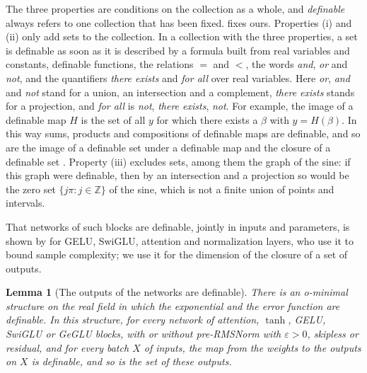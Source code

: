 \documentclass[10pt]{article}
\newtheorem{lemma}[theorem]{Lemma}
\theoremstyle{definition}
\theoremstyle{remark}
\begin{document}
The three properties are conditions on the collection as a whole, and \emph{definable} always refers to one collection that has been fixed.  fixes ours. Properties (i) and (ii) only add sets to the collection. In a collection with the three properties, a set is definable as soon as it is described by a formula built from real variables and constants, definable functions, the relations $=$ and $<$, the words \emph{and}, \emph{or} and \emph{not}, and the quantifiers \emph{there exists} and \emph{for all} over real variables. Here \emph{or}, \emph{and} and \emph{not} stand for a union, an intersection and a complement, \emph{there exists} stands for a projection, and \emph{for all} is \emph{not}, \emph{there exists}, \emph{not}. For example, the image of a definable map $H$ is the set of all $y$ for which there exists a $\beta$ with $y = H(\beta)$. In this way sums, products and compositions of definable maps are definable, and so are the image of a definable set under a definable map \citep[Chapter~1, Lemma~(2.3)]{vandendries1998tame} and the closure of a definable set \citep[Chapter~1, Lemma~(3.4)]{vandendries1998tame}. Property (iii) excludes sets, among them the graph of the sine: if this graph were definable, then by an intersection and a projection so would be the zero set $\{j\pi : j \in \mathbb{Z}\}$ of the sine, which is not a finite union of points and intervals.

That networks of such blocks are definable, jointly in inputs and parameters, is shown by \citet[Propositions~2.5, 4.7, 4.8 and~B.11]{kratsios2026definable} for GELU, SwiGLU, attention and normalization layers, who use it to bound sample complexity; we use it for the dimension of the closure of a set of outputs.

\begin{lemma}[The outputs of the networks are definable]\label{lem:defnets}
There is an o-minimal structure on the real field in which the exponential and the error function are definable. In this structure, for every network of attention, $\tanh$, GELU, SwiGLU or GeGLU blocks, with or without pre-RMSNorm with $\varepsilon > 0$, skipless or residual, and for every batch $X$ of inputs, the map from the weights to the outputs on $X$ is definable, and so is the set of these outputs.
\end{lemma}
\end{document}
